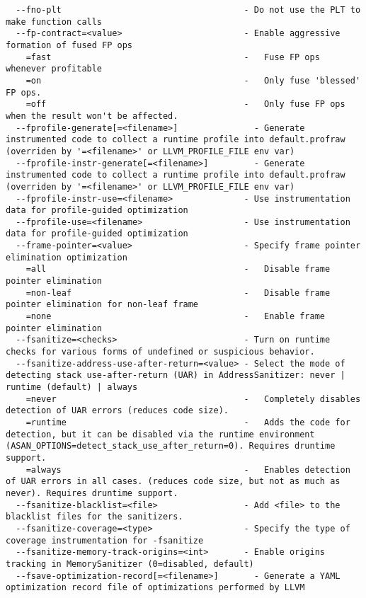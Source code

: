 \documentclass{studrep}
\begin{document}
\begin{verbatim}
  --fno-plt                                    - Do not use the PLT to make function calls
  --fp-contract=<value>                        - Enable aggressive formation of fused FP ops
    =fast                                      -   Fuse FP ops whenever profitable
    =on                                        -   Only fuse 'blessed' FP ops.
    =off                                       -   Only fuse FP ops when the result won't be affected.
  --fprofile-generate[=<filename>]               - Generate instrumented code to collect a runtime profile into default.profraw (overriden by '=<filename>' or LLVM_PROFILE_FILE env var)
  --fprofile-instr-generate[=<filename>]         - Generate instrumented code to collect a runtime profile into default.profraw (overriden by '=<filename>' or LLVM_PROFILE_FILE env var)
  --fprofile-instr-use=<filename>              - Use instrumentation data for profile-guided optimization
  --fprofile-use=<filename>                    - Use instrumentation data for profile-guided optimization
  --frame-pointer=<value>                      - Specify frame pointer elimination optimization
    =all                                       -   Disable frame pointer elimination
    =non-leaf                                  -   Disable frame pointer elimination for non-leaf frame
    =none                                      -   Enable frame pointer elimination
  --fsanitize=<checks>                         - Turn on runtime checks for various forms of undefined or suspicious behavior.
  --fsanitize-address-use-after-return=<value> - Select the mode of detecting stack use-after-return (UAR) in AddressSanitizer: never | runtime (default) | always
    =never                                     -   Completely disables detection of UAR errors (reduces code size).
    =runtime                                   -   Adds the code for detection, but it can be disabled via the runtime environment (ASAN_OPTIONS=detect_stack_use_after_return=0). Requires druntime support.
    =always                                    -   Enables detection of UAR errors in all cases. (reduces code size, but not as much as never). Requires druntime support.
  --fsanitize-blacklist=<file>                 - Add <file> to the blacklist files for the sanitizers.
  --fsanitize-coverage=<type>                  - Specify the type of coverage instrumentation for -fsanitize
  --fsanitize-memory-track-origins=<int>       - Enable origins tracking in MemorySanitizer (0=disabled, default)
  --fsave-optimization-record[=<filename>]       - Generate a YAML optimization record file of optimizations performed by LLVM

\end{verbatim}
\end{document}
